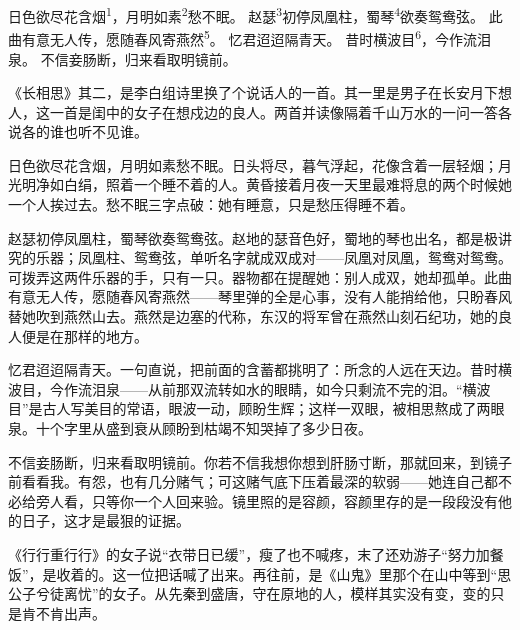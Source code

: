 
\begin{poem}
日色欲尽花含烟\textsuperscript{1}，月明如素\textsuperscript{2}愁不眠。
赵瑟\textsuperscript{3}初停凤凰柱，蜀琴\textsuperscript{4}欲奏鸳鸯弦。
此曲有意无人传，愿随春风寄燕然\textsuperscript{5}。
忆君迢迢隔青天。
昔时横波目\textsuperscript{6}，今作流泪泉。
不信妾肠断，归来看取明镜前。
\end{poem}

\begin{annotations}
\end{annotations}

\begin{appreciation}
《长相思》其二，是李白组诗里换了个说话人的一首。其一里是男子在长安月下想人，这一首是闺中的女子在想戍边的良人。两首并读像隔着千山万水的一问一答各说各的谁也听不见谁。

日色欲尽花含烟，月明如素愁不眠。日头将尽，暮气浮起，花像含着一层轻烟；月光明净如白绢，照着一个睡不着的人。黄昏接着月夜一天里最难将息的两个时候她一个人挨过去。愁不眠三字点破：她有睡意，只是愁压得睡不着。

赵瑟初停凤凰柱，蜀琴欲奏鸳鸯弦。赵地的瑟音色好，蜀地的琴也出名，都是极讲究的乐器；凤凰柱、鸳鸯弦，单听名字就成双成对——凤凰对凤凰，鸳鸯对鸳鸯。可拨弄这两件乐器的手，只有一只。器物都在提醒她：别人成双，她却孤单。此曲有意无人传，愿随春风寄燕然——琴里弹的全是心事，没有人能捎给他，只盼春风替她吹到燕然山去。燕然是边塞的代称，东汉的将军曾在燕然山刻石纪功，她的良人便是在那样的地方。

忆君迢迢隔青天。一句直说，把前面的含蓄都挑明了：所念的人远在天边。昔时横波目，今作流泪泉——从前那双流转如水的眼睛，如今只剩流不完的泪。“横波目”是古人写美目的常语，眼波一动，顾盼生辉；这样一双眼，被相思熬成了两眼泉。十个字里从盛到衰从顾盼到枯竭不知哭掉了多少日夜。

不信妾肠断，归来看取明镜前。你若不信我想你想到肝肠寸断，那就回来，到镜子前看看我。有怨，也有几分赌气；可这赌气底下压着最深的软弱——她连自己都不必给旁人看，只等你一个人回来验。镜里照的是容颜，容颜里存的是一段段没有他的日子，这才是最狠的证据。

《行行重行行》的女子说“衣带日已缓”，瘦了也不喊疼，末了还劝游子“努力加餐饭”，是收着的。这一位把话喊了出来。再往前，是《山鬼》里那个在山中等到“思公子兮徒离忧”的女子。从先秦到盛唐，守在原地的人，模样其实没有变，变的只是肯不肯出声。
\end{appreciation}

